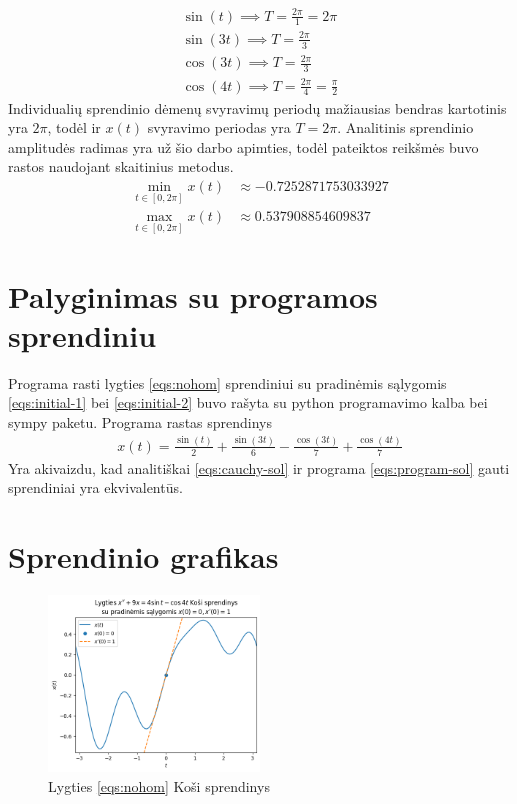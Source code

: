 \documentclass[11pt]{article}
\begin{document}
\begin{align*}
\sin(t)\implies T=\frac{2\pi}{1}=2\pi\\
\sin(3t)\implies T=\frac{2\pi}{3}\\
\cos(3t)\implies T=\frac{2\pi}{3}\\
\cos(4t)\implies T=\frac{2\pi}{4}=\frac{\pi}{2}
\end{align*}
Individualių sprendinio dėmenų svyravimų periodų mažiausias bendras kartotinis yra $2\pi$, todėl ir $x(t)$ svyravimo periodas yra $T=2\pi$. Analitinis sprendinio amplitudės radimas yra
už šio darbo apimties, todėl pateiktos reikšmės buvo rastos naudojant skaitinius metodus.
\begin{align*}
\min_{t\in[0,2\pi]}x(t)&\approx -0.7252871753033927\\
\max_{t\in[0,2\pi]}x(t)&\approx 0.537908854609837
\end{align*}
\section{Palyginimas su programos sprendiniu}
Programa rasti lygties \eqref{eqs:nohom} sprendiniui su pradinėmis sąlygomis \eqref{eqs:initial-1} bei \eqref{eqs:initial-2} buvo rašyta su python programavimo
kalba bei sympy paketu. Programa rastas sprendinys
\begin{align}
x(t)=\frac{\sin(t)}{2}+\frac{\sin(3t)}{6}-\frac{\cos(3t)}{7}+\frac{\cos(4t)}{7}\label{eqs:program-sol}
\end{align}
Yra akivaizdu, kad analitiškai \eqref{eqs:cauchy-sol} ir programa \eqref{eqs:program-sol} gauti sprendiniai yra ekvivalentūs.
\section{Sprendinio grafikas}
\begin{figure}[h!]
\centering
\includegraphics[width=0.5\textwidth]{graph.png}
\caption{Lygties \eqref{eqs:nohom} Koši sprendinys}
\label{fig:cauchy-sol}
\end{figure}
\end{document}
